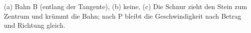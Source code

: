 (a) Bahn B (entlang der Tangente), (b) keine, (c) Die Schnur zieht den Stein zum Zentrum und krümmt die Bahn; nach P bleibt die Geschwindigkeit nach Betrag und Richtung gleich.

